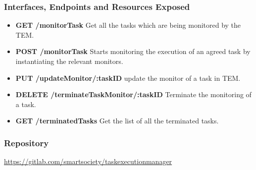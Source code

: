 \subsubsection{Interfaces, Endpoints and Resources Exposed}
\begin{itemize}
\item {\bf GET /monitorTask} Get all the tasks which are being monitored by the TEM.
\item {\bf POST /monitorTask} Starts monitoring the execution of an agreed task by instantiating the relevant monitors. 
\item {\bf PUT /updateMonitor/:taskID} update the monitor of a task in TEM.
\item {\bf DELETE /terminateTaskMonitor/:taskID} Terminate the monitoring of a task.
\item {\bf GET /terminatedTasks} Get the list of all the terminated tasks.
\end{itemize}
\subsubsection{Repository}
\url{https://gitlab.com/smartsociety/taskexecutionmanager}